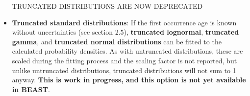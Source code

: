 \documentclass{article}
\begin{document}
\begin{itemize}
 TRUNCATED DISTRIBUTIONS ARE NOW DEPRECATED
\item
{\bf Truncated standard distributions}: If the first occurrence age is known without uncertainties (see section 2.5), {\bf truncated lognormal}, {\bf truncated gamma}, and {\bf truncated normal distributions} can be fitted to the calculated probability densities. As with untruncated distributions, these are scaled during the fitting process and the scaling factor is not reported, but unlike untruncated distributions, truncated distributions will not sum to 1 anyway. {\bf This is work in progress, and this option is not yet available in BEAST}.
\fi
\end{itemize}




\end{document}
